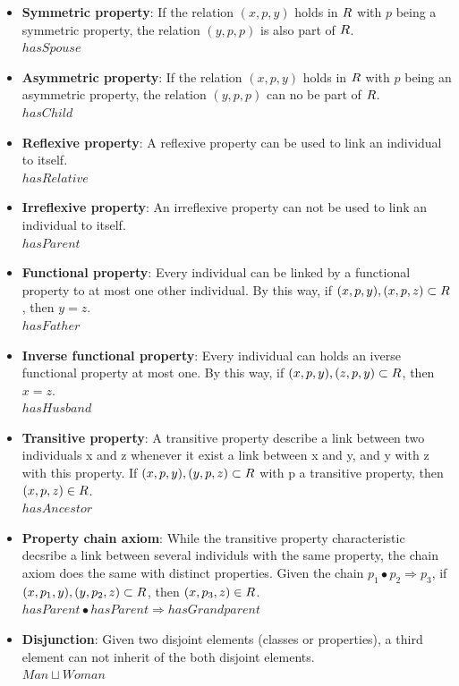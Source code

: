 \begin{itemize}
	\item \textbf{Symmetric property}: If the relation $(x, p, y)$ holds in $R$ with $p$ being a symmetric property, the relation $(y, p, p)$ is also part of $R$. \\ $hasSpouse$
	
	\item \textbf{Asymmetric property}: If the relation $(x, p, y)$ holds in $R$ with $p$ being an asymmetric property, the relation $(y, p, p)$ can no be part of $R$. \\ $hasChild$
	
	\item \textbf{Reflexive property}: A reflexive property can be used to link an individual to itself. \\ $hasRelative$
	
	\item \textbf{Irreflexive property}: An irreflexive property can not be used to link an individual to itself. \\ $hasParent$
	
	\item \textbf{Functional property}: Every individual can be linked by a functional property to at most one other individual. By this way, if ${(x, p, y), (x, p, z)} \subset R$, then $y = z$. \\ $hasFather$
	
	\item \textbf{Inverse functional property}: Every individual can holds an iverse functional property at most one. By this way, if ${(x, p, y), (z, p, y)} \subset R$, then $x = z$. \\ $hasHusband$
	
	\item \textbf{Transitive property}: A transitive property describe a link between two individuals x and z whenever it exist a link between x and y, and y with z with this property. If ${(x, p, y), (y, p, z)} \subset R$ with p a transitive property, then $(x, p, z) \in R$. \\ $hasAncestor$
	
	\item \textbf{Property chain axiom}: While the transitive property characteristic decsribe a link between several individuls with the same property, the chain axiom does the same with distinct properties. Given the chain $p_1 \bullet p_2 \Rightarrow p_3$, if ${(x, p_1, y), (y, p_2, z)} \subset R$, then $(x, p_3, z) \in R$. \\ $hasParent \bullet hasParent \Rightarrow hasGrandparent$
	
	\item \textbf{Disjunction}: Given two disjoint elements (classes or properties), a third element can not inherit of the both disjoint elements. \\ $Man \sqcup Woman$
\end{itemize}

